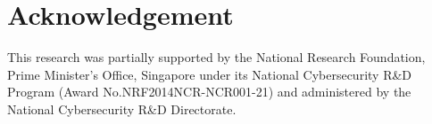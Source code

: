 \section{Acknowledgement}
This research was partially supported by the National Research 
Foundation, Prime Minister’s Office, Singapore under its National Cybersecurity 
R\&D Program (Award No.NRF2014NCR-NCR001-21) and administered 
by the National Cybersecurity R\&D Directorate. 
